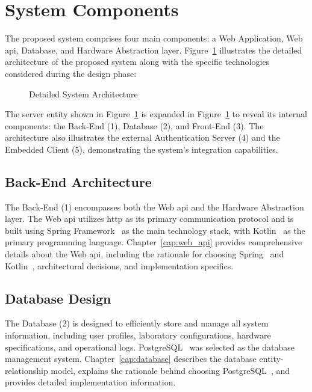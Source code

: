 \section{System Components}\label{sec:system_components}
The proposed system comprises four main components: a Web Application, Web \acs{api}, Database, and Hardware Abstraction layer. Figure~\ref{fig:detailed_architecture} illustrates the detailed architecture of the proposed system along with the specific technologies considered during the design phase:

\begin{figure}[H]
    \centering
    
\caption{Detailed System Architecture}
\label{fig:detailed_architecture}
\end{figure}

The server entity shown in Figure~\ref{fig:detailed_architecture} is expanded in Figure~\ref{fig:detailed_architecture} to reveal its internal components: the Back-End (1), Database (2), and Front-End (3). The architecture also illustrates the external Authentication Server (4) and the Embedded Client (5), demonstrating the system's integration capabilities.

\subsection*{Back-End Architecture}
The Back-End (1) encompasses both the Web \acs{api} and the Hardware Abstraction layer. The Web \acs{api} utilizes \ac{http} as its primary communication protocol and is built using Spring Framework~\cite{spring-framework} as the main technology stack, with Kotlin~\cite{kotlin} as the primary programming language. Chapter~\ref{cap:web_api} provides comprehensive details about the Web \acs{api}, including the rationale for choosing Spring~\cite{spring} and Kotlin~\cite{kotlin}, architectural decisions, and implementation specifics.

\subsection*{Database Design}
The Database (2) is designed to efficiently store and manage all system information, including user profiles, laboratory configurations, hardware specifications, and operational logs. PostgreSQL~\cite{postgresql} was selected as the database management system. Chapter~\ref{cap:database} describes the database entity-relationship model, explains the rationale behind choosing PostgreSQL~\cite{postgresql}, and provides detailed implementation information.

